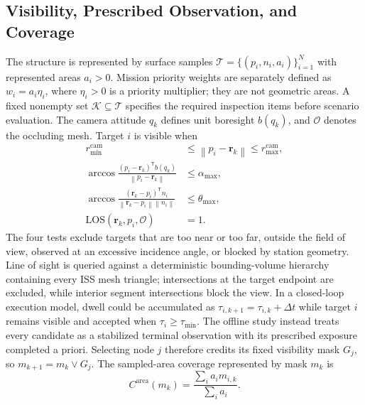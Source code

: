 \documentclass{IEEEtaes}
\newcommand{\dt}{\Delta t}
\newcommand{\norm}[1]{\left\lVert #1 \right\rVert}
\newcommand{\los}{\mathrm{LOS}}
\theoremstyle{remark}
\theoremstyle{plain}
\begin{document}
\subsection{Visibility, Prescribed Observation, and Coverage}

The structure is represented by surface samples $\mathcal T=\{(p_i,n_i,a_i)\}_{i=1}^{N}$ with represented areas $a_i>0$. Mission priority weights are separately defined as $w_i=a_i\eta_i$, where $\eta_i>0$ is a priority multiplier; they are not geometric areas. A fixed nonempty set $\mathcal K\subseteq\mathcal T$ specifies the required inspection items before scenario evaluation. The camera attitude $q_k$ defines unit boresight $b(q_k)$, and $\mathcal O$ denotes the occluding mesh. Target $i$ is visible when
\begin{align}
  r_{\min}^{\mathrm{cam}}&\le\norm{p_i-\mathbf r_k}\le r_{\max}^{\mathrm{cam}},\nonumber\\
  \arccos\!\frac{(p_i-\mathbf r_k)^{\mathsf T}b(q_k)}
  {\norm{p_i-\mathbf r_k}}&\le\alpha_{\max},\nonumber\\
  \arccos\!\frac{(\mathbf r_k-p_i)^{\mathsf T}n_i}
  {\norm{\mathbf r_k-p_i}\norm{n_i}}&\le\theta_{\max},\nonumber\\
  \los(\mathbf r_k,p_i,\mathcal O)&=1.
  \label{eq:visibility}
\end{align}
The four tests exclude targets that are too near or too far, outside the field of view, observed at an excessive incidence angle, or blocked by station geometry. Line of sight is queried against a deterministic bounding-volume hierarchy containing every ISS mesh triangle; intersections at the target endpoint are excluded, while interior segment intersections block the view. In a closed-loop execution model, dwell could be accumulated as $\tau_{i,k+1}=\tau_{i,k}+\dt$ while target $i$ remains visible and accepted when $\tau_i\ge\tau_{\min}$. The offline study instead treats every candidate as a stabilized terminal observation with its prescribed exposure completed a priori. Selecting node $j$ therefore credits its fixed visibility mask $G_j$, so $m_{k+1}=m_k\lor G_j$. The sampled-area coverage represented by mask $m_k$ is
\begin{equation}
  C^{\mathrm{area}}(m_k)=\frac{\sum_i a_i m_{i,k}}{\sum_i a_i}.
  \label{eq:coverage}
\end{equation}
\end{document}

